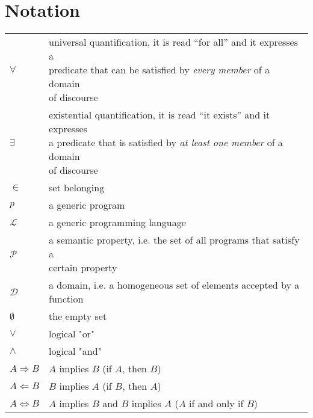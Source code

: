 \documentclass[target=mst,aauheader=aics]{thud}
\theoremstyle{definition}
\begin{document}
\begin{comment}
I cannot conclude this section without mentioning the person to whom this thesis is dedicated, dott. Barbara Angelini. She took me under her wing when I was a fragile teenager who was going through a very harsh period of life, but with the patience of a mother and the determination typical of her character, she assisted me for almost ten years and made me become the strong, confident person I am now. I am deeply convinced that, without her help, today I wouldn't be here, sitting at my desk and finishing this thesis. Unfortunately, she passed away  before she could see this accomplishment, but I think she would be proud of what I achieved. 

\textit{``Avanti tutta!''}

\end{comment}
\tableofcontents

\mainmatter

\chapter*{Notation}\label{chapter:notation}
	
	\renewcommand{\arraystretch}{2.0}
	\setlength{\tabcolsep}{25pt}
	\begin{tabular}{l l}
		$\forall$ & \makecell[l]{universal quantification, it is read ``for all'' and it expresses a \\predicate that can be satisfied by \textit{every member} of a domain\\ of discourse} \\
		$\exists$ & \makecell[l]{existential quantification, it is read ``it exists'' and it expresses \\a predicate that is satisfied by \textit{at least one member} of a domain\\ of discourse} \\
		$\in$ & set belonging \\
		$p$ & a generic program \\
		$\mathcal{L}$ & a generic programming language \\
		$\mathcal{P}$ & \makecell[l]{a semantic property, i.e. the set of all programs that satisfy a\\certain property} \\
		$\mathcal{D}$ & a domain, i.e. a homogeneous set of elements accepted by a function\\
		$\emptyset$ & the empty set \\
		$\vee$ & logical "or"\\
		$\wedge$ & logical "and"\\
		$A \Longrightarrow B$ & $A$ implies $B$ (if $A$, then $B$)\\
		$A \Longleftarrow B$ & $B$ implies $A$ (if $B$, then $A$)\\
		$A \Longleftrightarrow B$& $A$ implies $B$ and $B$ implies $A$ ($A$ if and only if $B$)\\
	\end{tabular}
\end{document}
